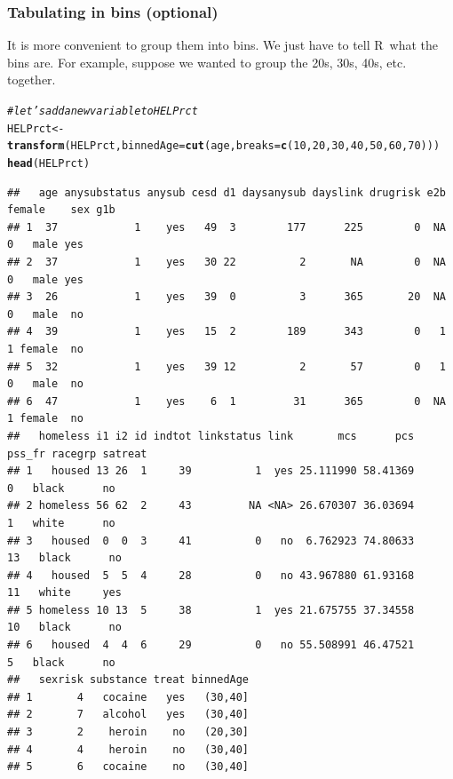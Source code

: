 \documentclass[twoside]{book}\usepackage[]{graphicx}\usepackage[]{xcolor}
\makeatletter
\newcommand{\hlnum}[1]{\textcolor[rgb]{0.686,0.059,0.569}{#1}}%
\newcommand{\hlcom}[1]{\textcolor[rgb]{0.678,0.584,0.686}{\textit{#1}}}%
\newcommand{\hlstd}[1]{\textcolor[rgb]{0.345,0.345,0.345}{#1}}%
\newcommand{\hlkwb}[1]{\textcolor[rgb]{0.69,0.353,0.396}{#1}}%
\newcommand{\hlkwc}[1]{\textcolor[rgb]{0.333,0.667,0.333}{#1}}%
\newcommand{\hlkwd}[1]{\textcolor[rgb]{0.737,0.353,0.396}{\textbf{#1}}}%
\newenvironment{kframe}{%
 \def\at@end@of@kframe{}%
 \ifinner\ifhmode%
  \def\at@end@of@kframe{\end{minipage}}%
  \begin{minipage}{\columnwidth}%
 \fi\fi%
 \def\FrameCommand##1{\hskip\@totalleftmargin \hskip-\fboxsep
 \colorbox{shadecolor}{##1}\hskip-\fboxsep
     \hskip-\linewidth \hskip-\@totalleftmargin \hskip\columnwidth}%
 \MakeFramed {\advance\hsize-\width
   \@totalleftmargin\z@ \linewidth\hsize
   \@setminipage}}%
 {\par\unskip\endMakeFramed%
 \at@end@of@kframe}
\newenvironment{knitrout}{}{} %
\newcommand{\Rindex}[1]{\index{\texttt{#1}}}
\def\R{{\sf R}}
\newcounter{example}[section]
\makeatother
\begin{document}
\subsubsection*{Tabulating in bins (optional)}
It is more convenient to group them into bins.  We just have to tell \R\ what the bins are.
For example, suppose we wanted to group the 20s, 30s, 40s, etc. together.
\Rindex{cut()}%
\Rindex{xtabs()}%
\Rindex{mtable()}%
\Rindex{table()}%
\begin{knitrout}
\color{fgcolor}\begin{kframe}
\begin{alltt}
\hlcom{# let's add a new variable to HELPrct}
\hlstd{HELPrct} \hlkwb{<-} \hlkwd{transform}\hlstd{(HELPrct,} \hlkwc{binnedAge} \hlstd{=} \hlkwd{cut}\hlstd{(age,} \hlkwc{breaks} \hlstd{=} \hlkwd{c}\hlstd{(}\hlnum{10}\hlstd{,} \hlnum{20}\hlstd{,} \hlnum{30}\hlstd{,} \hlnum{40}\hlstd{,} \hlnum{50}\hlstd{,} \hlnum{60}\hlstd{,} \hlnum{70}\hlstd{)))}
\hlkwd{head}\hlstd{(HELPrct)}
\end{alltt}
\begin{verbatim}
##   age anysubstatus anysub cesd d1 daysanysub dayslink drugrisk e2b female    sex g1b
## 1  37            1    yes   49  3        177      225        0  NA      0   male yes
## 2  37            1    yes   30 22          2       NA        0  NA      0   male yes
## 3  26            1    yes   39  0          3      365       20  NA      0   male  no
## 4  39            1    yes   15  2        189      343        0   1      1 female  no
## 5  32            1    yes   39 12          2       57        0   1      0   male  no
## 6  47            1    yes    6  1         31      365        0  NA      1 female  no
##   homeless i1 i2 id indtot linkstatus link       mcs      pcs pss_fr racegrp satreat
## 1   housed 13 26  1     39          1  yes 25.111990 58.41369      0   black      no
## 2 homeless 56 62  2     43         NA <NA> 26.670307 36.03694      1   white      no
## 3   housed  0  0  3     41          0   no  6.762923 74.80633     13   black      no
## 4   housed  5  5  4     28          0   no 43.967880 61.93168     11   white     yes
## 5 homeless 10 13  5     38          1  yes 21.675755 37.34558     10   black      no
## 6   housed  4  4  6     29          0   no 55.508991 46.47521      5   black      no
##   sexrisk substance treat binnedAge
## 1       4   cocaine   yes   (30,40]
## 2       7   alcohol   yes   (30,40]
## 3       2    heroin    no   (20,30]
## 4       4    heroin    no   (30,40]
## 5       6   cocaine    no   (30,40]

\end{verbatim}
\end{kframe}
\end{knitrout}
\end{document}
